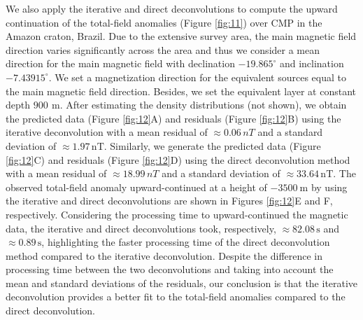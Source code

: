 We also apply the iterative and direct deconvolutions to compute the upward continuation of the 
total-field anomalies (Figure \ref{fig:11}) over CMP in the Amazon craton, Brazil.
Due to the extensive survey area, the main magnetic field direction varies significantly across the area 
and thus we consider a mean direction for the main magnetic field with 
declination $-19.865^{\circ}$  and inclination $-7.43915^{\circ}$.
We set a magnetization direction for the equivalent sources equal to the main magnetic field direction.
Besides, we set the equivalent layer at constant depth $900 \, \: \mathrm{m}$.
After estimating the density distributions (not shown), we obtain 
the predicted data (Figure \ref{fig:12}A) and residuals (Figure \ref{fig:12}B) 
using the iterative deconvolution with a mean residual of $\approx 0.06 \, nT$ 
and a standard deviation of $\approx 1.97 \, \mathrm{nT}$. 
Similarly, we generate the predicted data (Figure \ref{fig:12}C) and residuals (Figure \ref{fig:12}D) using the direct deconvolution method with a mean residual of $\approx 18.99 \, nT$ 
and a standard deviation of $\approx 33.64 \, \mathrm{nT}$. 
The observed total-field anomaly upward-continued  at a height of $-3500 \: \mathrm{m}$
by using the iterative and direct deconvolutions are shown in Figures \ref{fig:12}E and F, respectively.
Considering the processing time to upward-continued the magnetic data, the iterative and direct deconvolutions took, respectively,  $ \approx 82.08  \, \mathrm{s}$ and $ \approx 0.89  \, \mathrm{s}$, highlighting the faster processing time of the direct deconvolution method compared to the iterative deconvolution.
Despite the difference in processing time between the two deconvolutions and taking into account the mean and standard deviations of the residuals, our conclusion is that the iterative deconvolution provides a better fit to the total-field anomalies compared to the direct deconvolution.




